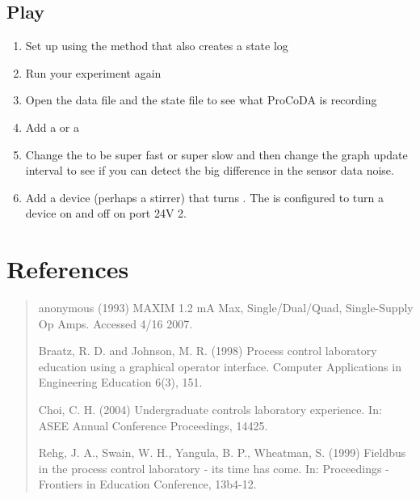 \documentclass[letterpaper,10pt,english]{sphinxmanual}
\begin{document}
\subsection{Play}
\label{\detokenize{ProCoDA/ProCoDA:play}}\begin{enumerate}
\item {} 
Set up {\hyperref[\detokenize{ProCoDA/ProCoDA:heading-procoda-logging-data}]{}} using the method that also creates a state log

\item {} 
Run your experiment again

\item {} 
Open the data file and the state file to see what ProCoDA is recording

\item {} 
Add a  {\hyperref[\detokenize{ProCoDA/ProCoDA:heading-procoda-pressure-measurement}]{}} or a {\hyperref[\detokenize{ProCoDA/ProCoDA:heading-procoda-temperature-measurement}]{}}

\item {} 
Change the {\hyperref[\detokenize{ProCoDA/ProCoDA:heading-procoda-configure}]{}} to be super fast or super slow and then change the graph update interval to see if you can detect the big difference in the sensor data noise.

\item {} 
Add a device (perhaps a stirrer) that turns {\hyperref[\detokenize{ProCoDA/ProCoDA:heading-procoda-on-off-devices}]{}}. The  is configured to turn a device on and off on port 24V 2.

\end{enumerate}


\section{References}
\label{\detokenize{ProCoDA/ProCoDA:references}}\begin{quote}

anonymous (1993) MAXIM 1.2 mA Max, Single/Dual/Quad, Single-Supply Op Amps. Accessed 4/16 2007. 

Braatz, R. D. and Johnson, M. R. (1998) Process control laboratory education using a graphical operator interface. Computer Applications in Engineering Education 6(3), 151.

Choi, C. H. (2004) Undergraduate controls laboratory experience. In: ASEE Annual Conference Proceedings, 14425.

Rehg, J. A., Swain, W. H., Yangula, B. P., Wheatman, S. (1999) Fieldbus in the process control laboratory - its time has come. In: Proceedings - Frontiers in Education Conference, 13b4-12.
\end{quote}
\end{document}
